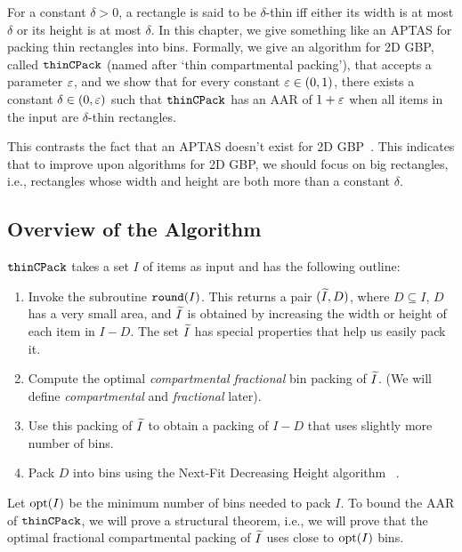 For a constant $\delta > 0$, a rectangle is said to be $\delta$-thin
iff either its width is at most $\delta$ or its height is at most $\delta$.
In this chapter, we give something like an APTAS for packing thin rectangles into bins.
Formally, we give an algorithm for 2D GBP, called $\operatorname{\mathtt{thinCPack}}$
(named after `thin compartmental packing'),
that accepts a parameter $\varepsilon$, and we show that for every constant $\varepsilon \in (0, 1)$,
there exists a constant $\delta \in (0, \varepsilon)$ such that $\operatorname{\mathtt{thinCPack}}$ has an AAR of $1+\varepsilon$
when all items in the input are $\delta$-thin rectangles.

This contrasts the fact that an APTAS doesn't exist for 2D GBP~\cite{bansal2006bin}.
This indicates that to improve upon algorithms for 2D GBP,
we should focus on big rectangles, i.e., rectangles whose
width and height are both more than a constant $\delta$.

\subsection*{Overview of the Algorithm}

$\operatorname{\mathtt{thinCPack}}$ takes a set $I$ of items as input and has the following outline:
\begin{enumerate}
\item Invoke the subroutine $\operatorname{\mathtt{round}}(I)$. This returns a pair $(\widetilde{I}, D)$,
    where $D \subseteq I$, $D$ has a very small area,
    and $\widetilde{I}$ is obtained by increasing the width or height of each item in $I - D$.
    The set $\widetilde{I}$ has special properties that help us easily pack it.
\item Compute the optimal \emph{compartmental fractional} bin packing of $\widetilde{I}$.
    (We will define \emph{compartmental} and \emph{fractional} later).
\item Use this packing of $\widetilde{I}$ to obtain a packing of $I - D$
    that uses slightly more number of bins.
\item Pack $D$ into bins using the Next-Fit Decreasing Height algorithm~%
\cite{coffman1980performance}.
\end{enumerate}

Let $\operatorname{opt}(I)$ be the minimum number of bins needed to pack $I$.
To bound the AAR of $\operatorname{\mathtt{thinCPack}}$, we will prove a structural theorem,
i.e., we will prove that the optimal fractional compartmental packing of $\widetilde{I}$
uses close to $\operatorname{opt}(I)$ bins.
